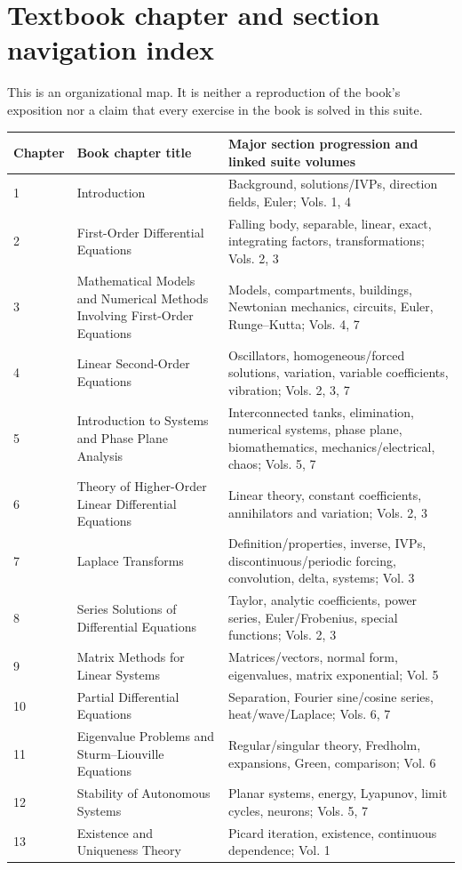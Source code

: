 \documentclass[11pt,letterpaper,oneside]{report}
\theoremstyle{definition}\newtheorem{definition}[theorem]{Definition}
\theoremstyle{remark}\newtheorem{remark}[theorem]{Remark}
\begin{document}
\chapter{Textbook chapter and section navigation index}
\begin{bookground}This is an organizational map. It is neither a reproduction of the book's exposition nor a claim that every exercise in the book is solved in this suite.\end{bookground}
\small
\begin{longtable}{p{}p{}p{}}
\toprule Chapter & Book chapter title & Major section progression and linked suite volumes \\ \midrule\endhead
1 & Introduction & Background, solutions/IVPs, direction fields, Euler; Vols. 1, 4 \\
2 & First-Order Differential Equations & Falling body, separable, linear, exact, integrating factors, transformations; Vols. 2, 3 \\
3 & Mathematical Models and Numerical Methods Involving First-Order Equations & Models, compartments, buildings, Newtonian mechanics, circuits, Euler, Runge--Kutta; Vols. 4, 7 \\
4 & Linear Second-Order Equations & Oscillators, homogeneous/forced solutions, variation, variable coefficients, vibration; Vols. 2, 3, 7 \\
5 & Introduction to Systems and Phase Plane Analysis & Interconnected tanks, elimination, numerical systems, phase plane, biomathematics, mechanics/electrical, chaos; Vols. 5, 7 \\
6 & Theory of Higher-Order Linear Differential Equations & Linear theory, constant coefficients, annihilators and variation; Vols. 2, 3 \\
7 & Laplace Transforms & Definition/properties, inverse, IVPs, discontinuous/periodic forcing, convolution, delta, systems; Vol. 3 \\
8 & Series Solutions of Differential Equations & Taylor, analytic coefficients, power series, Euler/Frobenius, special functions; Vols. 2, 3 \\
9 & Matrix Methods for Linear Systems & Matrices/vectors, normal form, eigenvalues, matrix exponential; Vol. 5 \\
10 & Partial Differential Equations & Separation, Fourier sine/cosine series, heat/wave/Laplace; Vols. 6, 7 \\
11 & Eigenvalue Problems and Sturm--Liouville Equations & Regular/singular theory, Fredholm, expansions, Green, comparison; Vol. 6 \\
12 & Stability of Autonomous Systems & Planar systems, energy, Lyapunov, limit cycles, neurons; Vols. 5, 7 \\
13 & Existence and Uniqueness Theory & Picard iteration, existence, continuous dependence; Vol. 1 \\
\bottomrule
\end{longtable}
\normalsize
\end{document}
